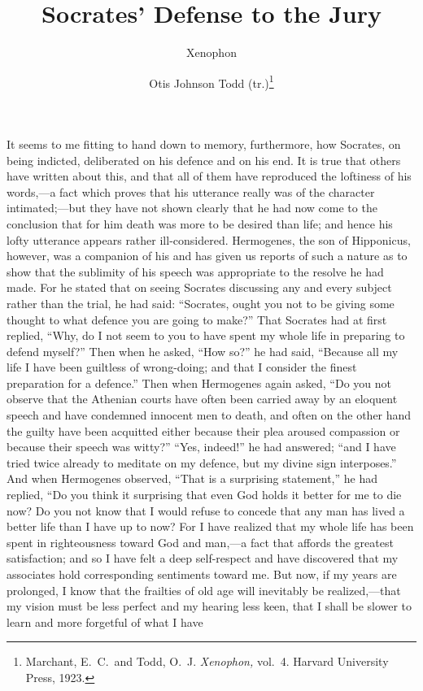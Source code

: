 \documentclass[12pt]{article}
\title{Socrates' Defense to the Jury}
\author{Xenophon \and Otis Johnson Todd (tr.)\footnote{Marchant, E.~C.~and
Todd, O.~J. \textit{Xenophon,} vol.~4. Harvard University Press, 1923.}}
\date{}
\begin{document}
\maketitle

\noindent It seems to me fitting to hand down to memory, furthermore, how
Socrates, on being indicted, deliberated on his defence and on his end. It is
true that others have written about this, and that all of them have reproduced
the loftiness of his words,---a fact which proves that his utterance really was
of the character intimated;---but they have not shown clearly that he had now
come to the conclusion that for him death was more to be desired than life; and
hence his lofty utterance appears rather ill-considered. Hermogenes, the son of
Hipponicus, however, was a companion of his and has given us reports of such a
nature as to show that the sublimity of his speech was appropriate to the
resolve he had made. For he stated that on seeing Socrates discussing any and
every subject rather than the trial, he had said: ``Socrates, ought you not to
be giving some thought to what defence you are going to make?'' That Socrates
had at first replied, ``Why, do I not seem to you to have spent my whole life
in preparing to defend myself?'' Then when he asked, ``How so?'' he had said,
``Because all my life I have been guiltless of wrong-doing; and that I consider
the finest preparation for a defence.'' Then when Hermogenes again asked, ``Do
you not observe that the Athenian courts have often been carried away by an
eloquent speech and have condemned innocent men to death, and often on the
other hand the guilty have been acquitted either because their plea aroused
compassion or because their speech was witty?'' ``Yes, indeed!'' he had
answered; ``and I have tried twice already to meditate on my defence, but my
divine sign interposes.'' And when Hermogenes observed, ``That is a surprising
statement,'' he had replied, ``Do you think it surprising that even God holds
it better for me to die now? Do you not know that I would refuse to concede
that any man has lived a better life than I have up to now? For I have realized
that my whole life has been spent in righteousness toward God and man,---a fact
that affords the greatest satisfaction; and so I have felt a deep self-respect
and have discovered that my associates hold corresponding sentiments toward me.
But now, if my years are prolonged, I know that the frailties of old age will
inevitably be realized,---that my vision must be less perfect and my hearing
less keen, that I shall be slower to learn and more forgetful of what I have
\end{document}
